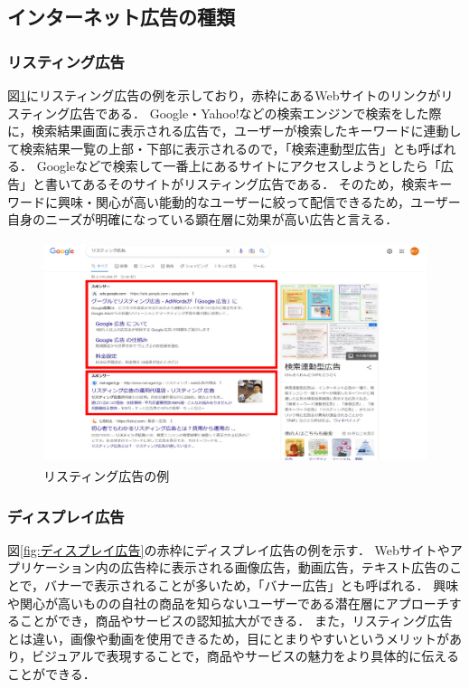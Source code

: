 \documentclass[12pt,a4j,titlepage]{ltjsarticle}
\begin{document}
\subsection{インターネット広告の種類}
\subsubsection{リスティング広告}
\label{subsubsec:rs}
図\ref{fig:リスティング広告}にリスティング広告の例を示しており，赤枠にあるWebサイトのリンクがリスティング広告である．
Google・Yahoo!などの検索エンジンで検索をした際に，検索結果画面に表示される広告で，ユーザーが検索したキーワードに連動して検索結果一覧の上部・下部に表示されるので，「検索連動型広告」とも呼ばれる\cite{listing}．
Googleなどで検索して一番上にあるサイトにアクセスしようとしたら「広告」と書いてあるそのサイトがリスティング広告である．
そのため，検索キーワードに興味・関心が高い能動的なユーザーに絞って配信できるため，ユーザー自身のニーズが明確になっている顕在層に効果が高い広告と言える．

\begin{figure}[H]
\begin{center}
 \includegraphics[height=65mm]{figures/リスティング広告.pdf}
\end{center}
 \caption{リスティング広告の例}
 \label{fig:リスティング広告}
\end{figure}

\subsubsection{ディスプレイ広告}
\label{subsubsec:ds}
図\ref{fig:ディスプレイ広告}の赤枠にディスプレイ広告の例を示す．
Webサイトやアプリケーション内の広告枠に表示される画像広告，動画広告，テキスト広告のことで，バナーで表示されることが多いため，「バナー広告」とも呼ばれる．
興味や関心が高いものの自社の商品を知らないユーザーである潜在層にアプローチすることができ，商品やサービスの認知拡大ができる\cite{display}．
また，リスティング広告とは違い，画像や動画を使用できるため，目にとまりやすいというメリットがあり，ビジュアルで表現することで，商品やサービスの魅力をより具体的に伝えることができる．
\end{document}
